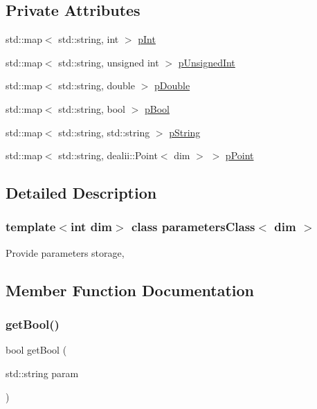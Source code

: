 \subsection*{Private Attributes}
\begin{DoxyCompactItemize}
\item 
std\+::map$<$ std\+::string, int $>$ \mbox{\hyperlink{classparameters_class_ac8ac4bc08d6cb6aed011bb1d0fc1203f}{p\+Int}}
\item 
std\+::map$<$ std\+::string, unsigned int $>$ \mbox{\hyperlink{classparameters_class_a997bcb31fee3242f776c7e05d709ce12}{p\+Unsigned\+Int}}
\item 
std\+::map$<$ std\+::string, double $>$ \mbox{\hyperlink{classparameters_class_a1e0e610c04bda534bcd48bb81ad75ffc}{p\+Double}}
\item 
std\+::map$<$ std\+::string, bool $>$ \mbox{\hyperlink{classparameters_class_abb7d3139bc101537c7f85fedfe94da2f}{p\+Bool}}
\item 
std\+::map$<$ std\+::string, std\+::string $>$ \mbox{\hyperlink{classparameters_class_a3453601308e73bcc0f45ed6ea8a9959b}{p\+String}}
\item 
std\+::map$<$ std\+::string, dealii\+::\+Point$<$ dim $>$ $>$ \mbox{\hyperlink{classparameters_class_a619a83b172e412339a12ea402580662c}{p\+Point}}
\end{DoxyCompactItemize}


\subsection{Detailed Description}
\subsubsection*{template$<$int dim$>$\newline
class parameters\+Class$<$ dim $>$}

Provide parameters storage, 

\subsection{Member Function Documentation}
\mbox{\label{classparameters_class_a7c4393bb42319d396ddf38c2464c7062}} 
\subsubsection{\texorpdfstring{getBool()}{getBool()}}
{\footnotesize\ttfamily bool get\+Bool (\begin{DoxyParamCaption}\item[{std\+::string}]{param }\end{DoxyParamCaption})}

